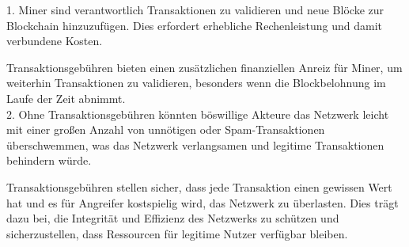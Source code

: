 \documentclass[german]{../uebung}
\begin{document}
\begin{exercise}{5}
    1. Miner sind verantwortlich Transaktionen zu validieren und neue Blöcke zur Blockchain hinzuzufügen. Dies erfordert erhebliche Rechenleistung und damit verbundene Kosten.

    Transaktionsgebühren bieten einen zusätzlichen finanziellen Anreiz für Miner, um weiterhin Transaktionen zu validieren, besonders wenn die Blockbelohnung im Laufe der Zeit abnimmt.\\
    2. Ohne Transaktionsgebühren könnten böswillige Akteure das Netzwerk leicht mit einer großen Anzahl von unnötigen oder Spam-Transaktionen überschwemmen, was das Netzwerk verlangsamen und legitime Transaktionen behindern würde.

    Transaktionsgebühren stellen sicher, dass jede Transaktion einen gewissen Wert hat und es für Angreifer kostspielig wird, das Netzwerk zu überlasten.
    Dies trägt dazu bei, die Integrität und Effizienz des Netzwerks zu schützen und sicherzustellen, dass Ressourcen für legitime Nutzer verfügbar bleiben.
\end{exercise}
\end{document}
